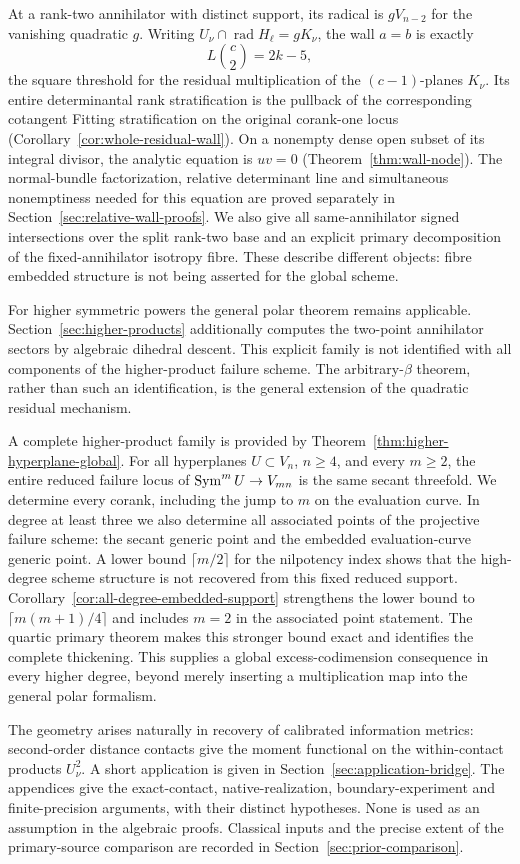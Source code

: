 At a rank-two annihilator with distinct support, its radical is
$gV_{n-2}$ for the vanishing quadratic $g$. Writing
$U_\nu\cap\operatorname{rad}H_\ell=gK_\nu$, the wall $a=b$
is exactly
\[
 L\binom c2=2k-5,
\]
the square threshold for the residual multiplication of the
$(c-1)$-planes $K_\nu$. Its entire determinantal rank stratification
is the pullback of the corresponding cotangent Fitting stratification
on the original corank-one locus
(Corollary~\ref{cor:whole-residual-wall}). On a nonempty dense
open subset of its integral divisor, the analytic equation is $uv=0$
(Theorem~\ref{thm:wall-node}). The normal-bundle factorization,
relative determinant line and simultaneous nonemptiness needed for
this equation are proved separately in
Section~\ref{sec:relative-wall-proofs}. We also give all
same-annihilator signed intersections over the split rank-two base
and an explicit primary decomposition of the fixed-annihilator
isotropy fibre. These describe different objects: fibre embedded
structure is not being asserted for the global scheme.

For higher symmetric powers the general polar theorem remains
applicable. Section~\ref{sec:higher-products} additionally computes
the two-point annihilator sectors by algebraic dihedral descent.
This explicit family is not identified with all components of the
higher-product failure scheme. The arbitrary-$\beta$ theorem,
rather than such an identification, is the general extension of the
quadratic residual mechanism.

A complete higher-product family is provided by
Theorem~\ref{thm:higher-hyperplane-global}. For all hyperplanes
$U\subset V_n$, $n\ge4$, and every $m\ge2$, the entire reduced
failure locus of $\operatorname{Sym}^mU\to V_{mn}$ is the same secant threefold.
We determine every corank, including the jump to $m$ on the evaluation
curve. In degree at least three we also determine all associated
points of the projective failure scheme: the secant generic point
and the embedded evaluation-curve generic point. A lower bound
$\lceil m/2\rceil$ for the nilpotency index shows that the high-degree
scheme structure is not recovered from this fixed reduced support.
Corollary~\ref{cor:all-degree-embedded-support} strengthens the lower
bound to $\lceil m(m+1)/4\rceil$ and includes $m=2$ in the associated
point statement. The quartic primary theorem makes this stronger
bound exact and identifies the complete thickening.
This supplies a global excess-codimension consequence in every higher
degree, beyond merely inserting a multiplication map into the general
polar formalism.

The geometry arises naturally in recovery of calibrated information
metrics: second-order distance contacts give the moment functional
on the within-contact products $U_\nu^2$. A short application is
given in Section~\ref{sec:application-bridge}. The appendices give the exact-contact, native-realization,
boundary-experiment and finite-precision arguments, with their
distinct hypotheses. None
is used as an assumption in the algebraic proofs. Classical inputs
and the precise extent of the primary-source comparison are recorded
in Section~\ref{sec:prior-comparison}.
